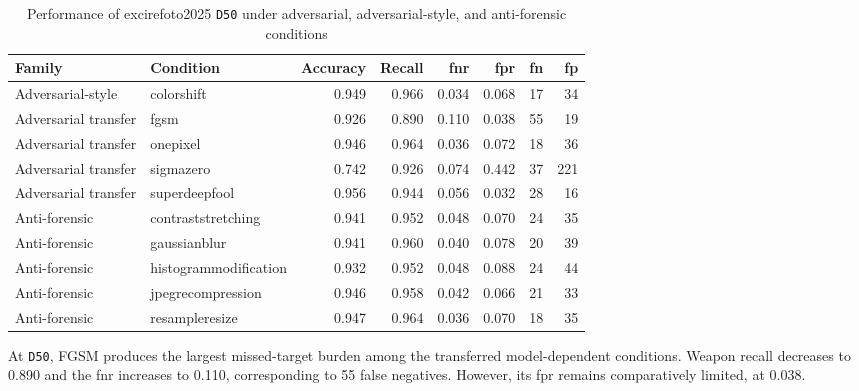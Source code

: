 \begin{table}[H]
\centering
\caption{Performance of \gls{excirefoto2025} \texttt{D50} under
adversarial, adversarial-style, and anti-forensic conditions}
\label{tab:results-excire-d50-attack-metrics}
\scriptsize
\renewcommand{\arraystretch}{1.12}
\setlength{\tabcolsep}{4pt}
\begin{tabular}{@{}l l r r r r r r@{}}
\toprule
\textbf{Family} &
\textbf{Condition} &
\textbf{Accuracy} &
\textbf{Recall} &
\textbf{\gls{fnr}} &
\textbf{\gls{fpr}} &
\textbf{\acrshort{fn}} &
\textbf{\acrshort{fp}} \\
\midrule

Adversarial-style
&
\gls{colorshift}
&
0.949
&
0.966
&
0.034
&
0.068
&
17
&
34 \\

Adversarial transfer
&
\gls{fgsm}
&
0.926
&
0.890
&
0.110
&
0.038
&
55
&
19 \\

Adversarial transfer
&
\gls{onepixel}
&
0.946
&
0.964
&
0.036
&
0.072
&
18
&
36 \\

Adversarial transfer
&
\gls{sigmazero}
&
0.742
&
0.926
&
0.074
&
0.442
&
37
&
221 \\

Adversarial transfer
&
\gls{superdeepfool}
&
0.956
&
0.944
&
0.056
&
0.032
&
28
&
16 \\

\midrule

Anti-forensic
&
\gls{contraststretching}
&
0.941
&
0.952
&
0.048
&
0.070
&
24
&
35 \\

Anti-forensic
&
\gls{gaussianblur}
&
0.941
&
0.960
&
0.040
&
0.078
&
20
&
39 \\

Anti-forensic
&
\gls{histogrammodification}
&
0.932
&
0.952
&
0.048
&
0.088
&
24
&
44 \\

Anti-forensic
&
\gls{jpegrecompression}
&
0.946
&
0.958
&
0.042
&
0.066
&
21
&
33 \\

Anti-forensic
&
\gls{resampleresize}
&
0.947
&
0.964
&
0.036
&
0.070
&
18
&
35 \\

\bottomrule
\end{tabular}
\end{table}

At \texttt{D50}, FGSM produces the largest missed-target burden among the
transferred model-dependent conditions. Weapon recall decreases to 0.890 and
the \gls{fnr} increases to 0.110, corresponding to 55 false negatives.
However, its \gls{fpr} remains comparatively limited, at 0.038.

